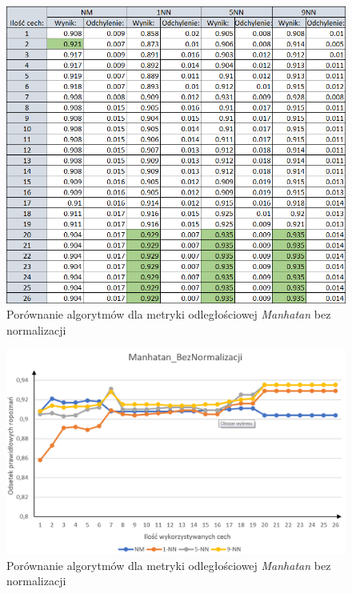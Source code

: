 \documentclass[12pt]{article}
\begin{document}
\begin{figure}[H]
	\centering
		\includegraphics[scale=0.8]{images/algorithms/manhatan_beznorm_tab.png}
	\caption{Porównanie algorytmów dla metryki odległościowej \textit{Manhatan} bez normalizacji}
\end{figure}
\begin{figure}[H]
	\centering
		\includegraphics[scale=0.66]{images/algorithms/manhatan_beznorm.png}
	\caption{Porównanie algorytmów dla metryki odległościowej \textit{Manhatan} bez normalizacji}
\end{figure}


\end{document}
